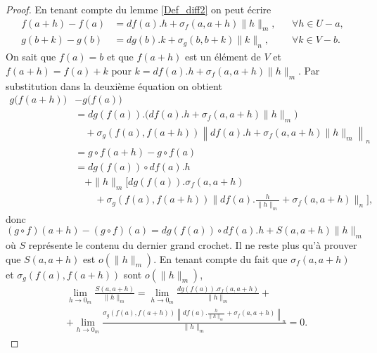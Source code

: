 \begin{proof}
 En tenant compte du lemme \ref{Def_diff2} on peut écrire 
 \begin{subequations}
	 \begin{align}
		f(a+h)-f(a)&=df(a).h+\sigma_f(a,a+h)\|h\|_m,	&&\forall h\in U-a,\\
		g(b+k)-g(b)&=dg(b).k+\sigma_g(b,b+k)\|k\|_n,	&&\forall k\in V-b.
	 \end{align}
 \end{subequations}
On sait que $f(a)=b$ et que $f(a+h)$ est  un élément de $V$ et $f(a+h)=f(a)+k$ pour $k=df(a).h+\sigma_f(a,a+h)\|h\|_m$.  Par substitution dans la deuxième équation on obtient 
\begin{equation}
	\begin{aligned}
		g\big(f(a+h)\big)& - g\big(f(a)\big)\\ 
		&=dg\left(f(a)\right).\Big(df(a).h+\sigma_f(a,a+h)\|h\|_m\Big)\\
		&\quad+\sigma_g\left(f(a), f(a+h)\right)\left\| df(a).h+\sigma_f(a,a+h)\|h\|_m\right \|_n\\
		&=g\circ f (a+h) - g\circ f (a)\\
		&= dg\left(f(a)\right)\circ df(a).h \\
		&\quad +\|h\|_m\Big[ dg\left(f(a)\right).\sigma_f(a,a+h)\\
		&\qquad+\sigma_g\left(f(a), f(a+h)\right)\big\| df(a).\frac{h}{\|h\|_m}+\sigma_f(a,a+h)\big \|_n\Big],
	\end{aligned}
\end{equation}
donc
\begin{equation}
	(g\circ f) (a+h) - (g\circ f) (a) = dg\left(f(a)\right)\circ df(a).h + S(a,a+h) \|h\|_m
\end{equation}
où $S$ représente le contenu du dernier grand crochet. Il ne reste plus qu'à prouver que $S(a,a+h)$ est $o(\|h\|_m)$. En tenant compte du fait que $\sigma_f(a,a+h)$ et $\sigma_g\left(f(a), f(a+h)\right)$ sont $o (\|h\|_m)$,
\begin{equation}
  \begin{aligned}
   & \lim_{h\to 0_m} \frac{S(a,a+h)}{\|h\|_m}= \lim_{h\to 0_m}\frac{dg\left(f(a)\right).\sigma_f(a,a+h)}{\|h\|_m}+ \\
& + \lim_{h\to 0_m}\frac{\sigma_g\left(f(a), f(a+h)\right)\left\| df(a).\frac{h}{\|h\|_m}+\sigma_f(a,a+h)\right \|_n}{\|h\|_m} = 0.
  \end{aligned}
\end{equation}
\end{proof}

